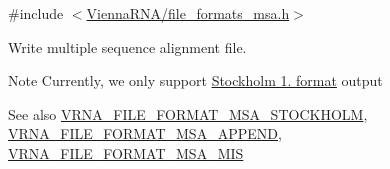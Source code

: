 {\ttfamily \#include $<$\hyperlink{file__formats__msa_8h}{Vienna\+R\+N\+A/file\+\_\+formats\+\_\+msa.\+h}$>$}



Write multiple sequence alignment file. 

\begin{DoxyNote}{Note}
Currently, we only support \hyperlink{file_formats_msa-formats-stockholm}{Stockholm 1. format} output
\end{DoxyNote}
\begin{DoxySeeAlso}{See also}
\hyperlink{group__file__utils_ga62be992445cd8ab2ad7a8fded944338b}{V\+R\+N\+A\+\_\+\+F\+I\+L\+E\+\_\+\+F\+O\+R\+M\+A\+T\+\_\+\+M\+S\+A\+\_\+\+S\+T\+O\+C\+K\+H\+O\+LM}, \hyperlink{group__file__utils_ga1577ea0f497d9c501549c863a4f2c089}{V\+R\+N\+A\+\_\+\+F\+I\+L\+E\+\_\+\+F\+O\+R\+M\+A\+T\+\_\+\+M\+S\+A\+\_\+\+A\+P\+P\+E\+ND}, \hyperlink{group__file__utils_ga494488a771aa0c602fb4cf445be34d47}{V\+R\+N\+A\+\_\+\+F\+I\+L\+E\+\_\+\+F\+O\+R\+M\+A\+T\+\_\+\+M\+S\+A\+\_\+\+M\+IS}
\end{DoxySeeAlso}

